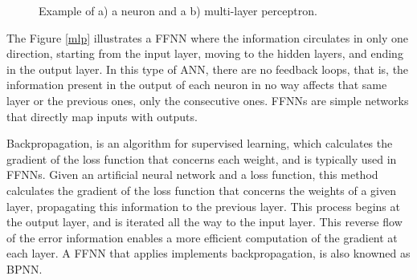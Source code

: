 \begin{figure}[h!]
\captionsetup[subfigure]{position=b}
\centering
{}
\hspace{0.05\textwidth}
\caption{Example of a) a neuron and a b) multi-layer perceptron.}
\end{figure}

The Figure \ref{mlp} illustrates a \ac{FFNN} where the information circulates in only one direction, starting from the input layer, moving to the hidden layers, and ending in the output layer. In this type of \acs{ANN}, there are no feedback loops, that is, the information present in the output of each neuron in no way affects that same layer or the previous ones, only the consecutive ones. \ac{FFNN}s are simple networks that directly map inputs with outputs.

Backpropagation, is an algorithm for supervised learning, which calculates the gradient of the loss function that concerns each weight, and is typically used in \ac{FFNN}s. Given an artificial neural network and a loss function, this method calculates the gradient of the loss function that concerns the weights of a given layer, propagating this information to the previous layer. This process begins at the output layer, and is iterated all the way to the input layer. This reverse flow of the error information enables a more efficient computation of the gradient at each layer. A \ac{FFNN} that applies implements backpropagation, is also knowned as \ac{BPNN}.


